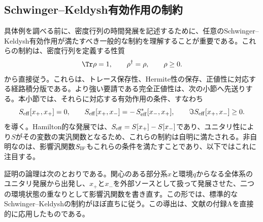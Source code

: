 \documentclass[a4paper,11pt,oneside]{article}
\theoremstyle{definition}
\numberwithin{equation}{section}
\begin{document}
\subsection{Schwinger--Keldysh有効作用の制約}



具体例を調べる前に、密度行列の時間発展を記述するために、任意のSchwinger--Keldysh有効作用が満たすべき一般的な制約を理解することが重要である。これらの制約は、密度行列を定義する性質
\begin{equation}
\Tr \rho = 1,
\qquad
\rho^\dagger = \rho,
\qquad
\rho \ge 0 .
\end{equation}
から直接従う。これらは、トレース保存性、Hermite性の保存、正値性に対応する経路積分版である。より強い要請である完全正値性は、次の小節へ先送りする。本小節では、それらに対応する有効作用の条件、すなわち
\begin{equation}
S_{\rm eff}[x_+,x_+]=0,
\qquad
S_{\rm eff}[x_+,x_-]= -\,S_{\rm eff}^*[x_-,x_+],
\qquad
\Im S_{\rm eff}[x_+,x_-]\geq 0 .
\end{equation}
を導く。Hamilton的な発展では、\(S_{\rm eff}=S[x_+]-S[x_-]\)であり、ユニタリ性により\(S\)がその変数の実汎関数となるため、これらの制約は自明に満たされる。非自明なのは、影響汎関数$  S_{\rm IF} $もこれらの条件を満たすことであり、以下ではこれに注目する。




証明の論理は次のとおりである。関心のある部分系\(x\)と環境\(q\)からなる全体系のユニタリ発展から出発し、\(x_+\)と\(x_-\)を外部ソースとして扱って発展させた、二つの環境状態の重なりとして影響汎関数を書き直す。この形では、標準的なSchwinger--Keldyshの制約がほぼ直ちに従う。この導出は、文献\cite{Glorioso:2016gsa,Salcedo:2024smn}の付録Aを直接的に応用したものである。
\end{document}
